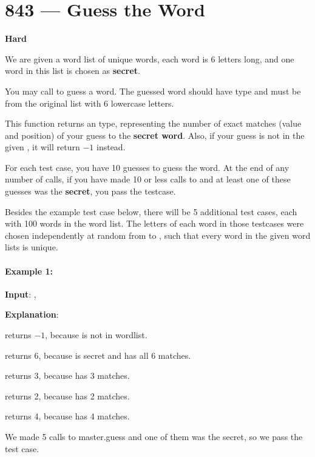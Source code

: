 \section{843 --- Guess the Word}

\textbf{Hard}

We are given a word list of unique words, each word is 6 letters long, and one word in this list is chosen as \textbf{secret}.

You may call  to guess a word.  The guessed word should have type  and must be from the original list with 6 lowercase letters.

This function returns an  type, representing the number of exact matches (value and position) of your guess to the \textbf{secret word}.  Also, if your guess is not in the given , it will return $-1$ instead.

For each test case, you have 10 guesses to guess the word. At the end of any number of calls, if you have made 10 or less calls to  and at least one of these guesses was the \textbf{secret}, you pass the testcase.

Besides the example test case below, there will be 5 additional test cases, each with 100 words in the word list.  The letters of each word in those testcases were chosen independently at random from  to , such that every word in the given word lists is unique.

\paragraph{Example 1:}

\begin{flushleft}
\textbf{Input}: , 

\textbf{Explanation}:

 returns $-1$, because  is not in wordlist.

 returns 6, because  is secret and has all 6 matches.

 returns 3, because  has 3 matches.

 returns 2, because  has 2 matches.

 returns 4, because  has 4 matches.

We made 5 calls to master.guess and one of them was the secret, so we pass the test case.
\end{flushleft}
